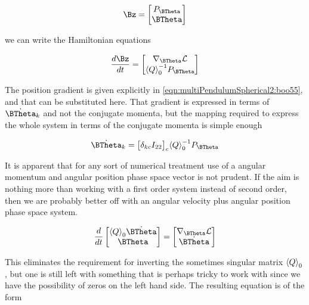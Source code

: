 \begin{align}\label{eqn:multiPendulumSpherical2:boo60}
\Bz = 
\begin{bmatrix}
P_{\BTheta} \\
\BTheta
\end{bmatrix}
\end{align}

we can write the Hamiltonian equations

\begin{align}\label{eqn:multiPendulumSpherical2:boo61}
\frac{d\Bz}{dt} = 
\begin{bmatrix}
\grad_{\BTheta} \LL \\
\gpgradezero{Q}^{-1} P_{\BTheta}
\end{bmatrix}
\end{align}

The position gradient is given explicitly in \ref{eqn:multiPendulumSpherical2:boo55}, and that can be substituted here.  That gradient is expressed in terms of $\dot{\BTheta}_k$ and not the conjugate momenta, but the mapping required to express the whole system in terms of the conjugate momenta is simple enough

\begin{align}\label{eqn:multiPendulumSpherical2:boo62}
\dot{\BTheta}_k = 
{\begin{bmatrix}
\delta_{kc} I_{22}
\end{bmatrix}}_c \gpgradezero{Q}^{-1} P_{\BTheta}
\end{align}

It is apparent that for any sort of numerical treatment use of a angular momentum and angular position phase space vector is not prudent.  If the aim is nothing more than working with a first order system instead of second order, then we are probably better off with an angular velocity plus angular position phase space system.  

\begin{align}\label{eqn:multiPendulumSpherical2:boo60a}
\frac{d}{dt}
\begin{bmatrix}
\gpgradezero{Q} \dot{\BTheta} \\
\BTheta
\end{bmatrix}
=
\begin{bmatrix}
\grad_{\BTheta} \LL \\
\dot{\BTheta}
\end{bmatrix}
\end{align}

This eliminates the requirement for inverting the sometimes singular matrix ${\left\langle{{Q}}\right\rangle}_{0}$, but one is still left with something that is perhaps tricky to work with since we have the possibility of zeros on the left hand side.  The resulting equation is of the form

